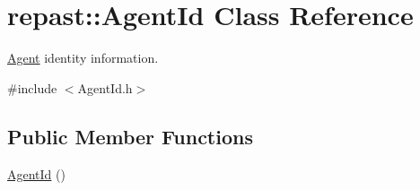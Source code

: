 \hypertarget{classrepast_1_1_agent_id}{\section{repast\-:\-:Agent\-Id Class Reference}
\label{classrepast_1_1_agent_id}
}


\hyperlink{classrepast_1_1_agent}{Agent} identity information.  




{\ttfamily \#include $<$Agent\-Id.\-h$>$}

\subsection*{Public Member Functions}
\begin{DoxyCompactItemize}
\item 
\hypertarget{classrepast_1_1_agent_id_ad1da5259ce0bfa4b99f0adea5646ff78}{\hyperlink{classrepast_1_1_agent_id_ad1da5259ce0bfa4b99f0adea5646ff78}{Agent\-Id} ()}\label{classrepast_1_1_agent_id_ad1da5259ce0bfa4b99f0adea5646ff78}


\end{DoxyCompactItemize}
